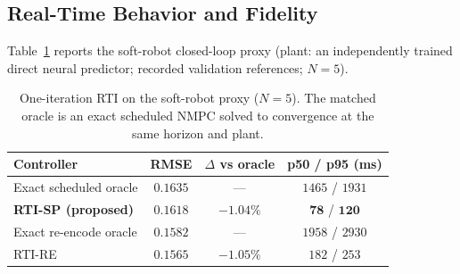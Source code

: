 

\subsection{Real-Time Behavior and Fidelity}   %

Table~\ref{tab:rti} reports the soft-robot closed-loop proxy (plant: an independently trained direct neural predictor; recorded validation references; $N=5$).

\begin{table}[!t]
\centering
\caption{One-iteration RTI on the soft-robot proxy ($N=5$). The matched oracle is an exact scheduled NMPC solved to convergence at the \textup{same} horizon and plant.}
\label{tab:rti}
\begin{tabular}{@{}lccc@{}}
\toprule
Controller & RMSE & $\Delta$ vs oracle & p50 / p95 (ms) \\
\midrule
Exact scheduled oracle & $0.1635$ & --- & $1465$ / $1931$ \\
\textbf{RTI-SP (proposed)} & $0.1618$ & $-1.04\%$ & $\mathbf{78}$ / $\mathbf{120}$ \\
Exact re-encode oracle & $0.1582$ & --- & $1958$ / $2930$ \\
RTI-RE & $0.1565$ & $-1.05\%$ & $182$ / $253$ \\
\bottomrule
\end{tabular}
\end{table}

